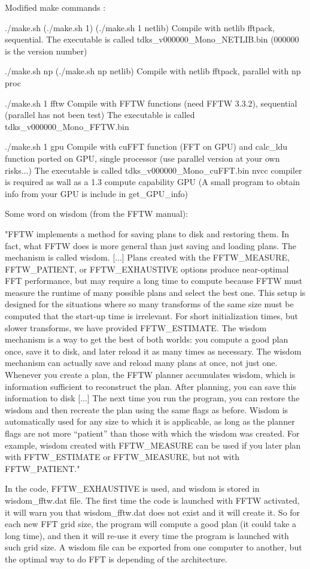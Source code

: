 Modified make commands :

./make.sh (./make.sh 1) (./make.sh 1 netlib) 
Compile with netlib fftpack, sequential. The executable is called tdks_v000000_Mono_NETLIB.bin (000000 is the version number)

./make.sh np (./make.sh np netlib)
Compile with netlib fftpack, parallel with np proc 

./make.sh 1 fftw
Compile with FFTW functions (need FFTW 3.3.2), sequential (parallel has not been test) The executable is called tdks_v000000_Mono_FFTW.bin

./make.sh 1 gpu
Compile with cuFFT function (FFT on GPU) and calc_ldu function ported on GPU, single processor (use parallel version at your own risks...)
The executable is called tdks_v000000_Mono_cuFFT.bin
nvcc compiler is required as wall as a 1.3 compute capability GPU (A small program to obtain info from your GPU is include in get_GPU_info)

Some word on wisdom (from the FFTW manual):

"FFTW implements a method for saving plans to disk and restoring them. In fact, what
FFTW does is more general than just saving and loading plans. The mechanism is called
wisdom. [...]
Plans created with the FFTW_MEASURE, FFTW_PATIENT, or FFTW_EXHAUSTIVE options produce
near-optimal FFT performance, but may require a long time to compute because FFTW
must measure the runtime of many possible plans and select the best one. This setup is
designed for the situations where so many transforms of the same size must be computed
that the start-up time is irrelevant. For short initialization times, but slower transforms,
we have provided FFTW_ESTIMATE. The wisdom mechanism is a way to get the best of both
worlds: you compute a good plan once, save it to disk, and later reload it as many times as
necessary. The wisdom mechanism can actually save and reload many plans at once, not
just one.
Whenever you create a plan, the FFTW planner accumulates wisdom, which is information
sufficient to reconstruct the plan. After planning, you can save this information to disk
[...]
The next time you run the program, you can restore the wisdom and then recreate the plan using
the same flags as before.
Wisdom is automatically used for any size to which it is applicable, as long as the planner
flags are not more “patient” than those with which the wisdom was created. For example,
wisdom created with FFTW_MEASURE can be used if you later plan with FFTW_ESTIMATE or
FFTW_MEASURE, but not with FFTW_PATIENT."

In the code, FFTW_EXHAUSTIVE is used, and wisdom is stored in wisdom_fftw.dat file.
The first time the code is launched with FFTW activated, it will warn you that wisdom_fftw.dat does not exist and it will create it.
So for each new FFT grid size, the program will compute a good plan (it could take a long time), and then it will re-use it every time the program is launched with such grid size. A wisdom file can be exported from one computer to another, but the optimal way to do FFT is depending of the architecture.
